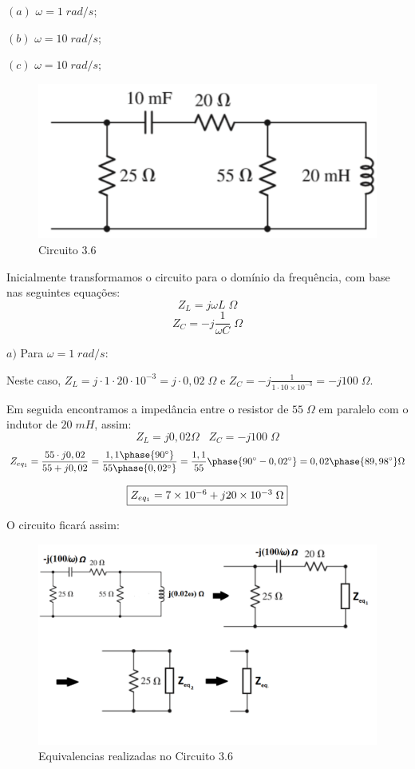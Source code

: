 \documentclass[
	12pt,				%
	oneside,			%
	a4paper,			%
	english,			%
	french,				%
	spanish,			%
	brazil				%
	]{abntex2}
\begin{document}
$(a)$ $\omega = 1\;rad/s$;

$(b)$ $\omega = 10\;rad/s$;

$(c)$ $\omega = 10\;rad/s$;

\begin{figure}[htb]
	\centering
	\includegraphics[scale=0.4]{3-06.PNG}
	\caption{Circuito 3.6}
\end{figure}
Inicialmente transformamos o circuito para o domínio da frequência, com base nas seguintes equações:
$$Z_L=j\omega L\;\Omega$$
$$Z_C=-j\dfrac{1}{\omega C}\;\Omega$$

$a)$ Para $\omega = 1\;rad/s$:

Neste caso, $Z_L=j\cdot1\cdot20\cdot10^{-3} = j\cdot0,02\;\Omega$ e $Z_C=-j\frac{1}{1\cdot10\times10^{-3}}=-j100\;\Omega$.

Em seguida encontramos a impedância entre o resistor de $55\;\Omega$ em paralelo com o indutor de $20\;mH$, assim:
$$Z_L=j0,02 \Omega \;\;\; Z_C=-j100\;\Omega$$
$$Z_{eq_1} = \dfrac{55 \cdot j0,02}{55 + j0,02} = \dfrac{1,1\phase{90^\circ}}{55\phase{0,02^\circ}} = \dfrac{1,1}{55}\phase{90^\circ - 0,02^\circ} = 0,02\phase{89,98^\circ} \Omega$$

\begin{equation}
    \centering
    \fbox{$Z_{eq_1} = 7\times10^{-6} + j20\times10^{-3}\;\Omega$}
\end{equation}
\newpage

O circuito ficará assim:

\begin{figure}[htb]
	\centering
	\includegraphics[scale=0.4]{3-06(a).PNG}
	\caption{Equivalencias realizadas no Circuito 3.6}
\end{figure}
\end{document}
